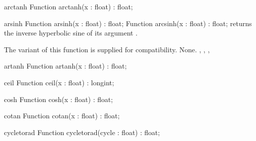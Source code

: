 \FPCexample{}


\begin{function}{arctanh}
\Declaration
Function arctanh(x : float) : float;
\Description

\Errors
\SeeAlso
\end{function}

\FPCexample{}


\begin{function}{arsinh}
\Declaration
Function arsinh(x : float) : float;
Function arcsinh(x : float) : float;
\Description
{} returns the inverse hyperbolic sine of its argument . 

The  variant of this function is supplied for \delphi 
compatibility.
\Errors
None.
\SeeAlso
{}, , , 
\end{function}



\begin{function}{artanh}
\Declaration
Function artanh(x : float) : float;
\Description

\Errors
\SeeAlso
\end{function}

\FPCexample{}


\begin{function}{ceil}
\Declaration
Function ceil(x : float) : longint;
\Description

\Errors
\SeeAlso
\end{function}

\FPCexample{}


\begin{function}{cosh}
\Declaration
Function cosh(x : float) : float;
\Description

\Errors
\SeeAlso
\end{function}

\FPCexample{}


\begin{function}{cotan}
\Declaration
Function cotan(x : float) : float;
\Description

\Errors
\SeeAlso
\end{function}

\FPCexample{}


\begin{function}{cycletorad}
\Declaration
Function cycletorad(cycle : float) : float;
\Description

\Errors
\SeeAlso
\end{function}


